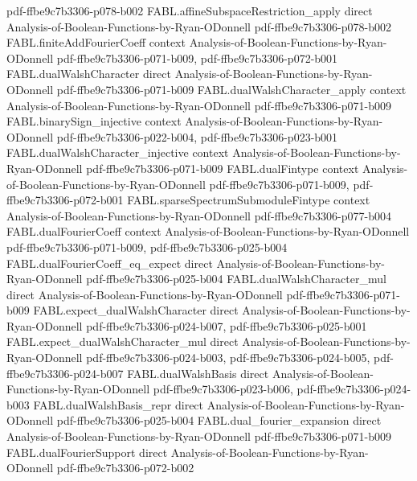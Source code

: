 \begin{theorem}
  {pdf-ffbe9c7b3306-p078-b002}
\proofstep
  {FABL.affineSubspaceRestriction_apply}
  {direct}
  {Analysis-of-Boolean-Functions-by-Ryan-ODonnell}
  {pdf-ffbe9c7b3306-p078-b002}
\proofstep
  {FABL.finiteAddFourierCoeff}
  {context}
  {Analysis-of-Boolean-Functions-by-Ryan-ODonnell}
  {pdf-ffbe9c7b3306-p071-b009,
    pdf-ffbe9c7b3306-p072-b001}
\proofstep
  {FABL.dualWalshCharacter}
  {direct}
  {Analysis-of-Boolean-Functions-by-Ryan-ODonnell}
  {pdf-ffbe9c7b3306-p071-b009}
\proofstep
  {FABL.dualWalshCharacter_apply}
  {context}
  {Analysis-of-Boolean-Functions-by-Ryan-ODonnell}
  {pdf-ffbe9c7b3306-p071-b009}
\proofstep
  {FABL.binarySign_injective}
  {context}
  {Analysis-of-Boolean-Functions-by-Ryan-ODonnell}
  {pdf-ffbe9c7b3306-p022-b004,
    pdf-ffbe9c7b3306-p023-b001}
\proofstep
  {FABL.dualWalshCharacter_injective}
  {context}
  {Analysis-of-Boolean-Functions-by-Ryan-ODonnell}
  {pdf-ffbe9c7b3306-p071-b009}
\proofstep
  {FABL.dualFintype}
  {context}
  {Analysis-of-Boolean-Functions-by-Ryan-ODonnell}
  {pdf-ffbe9c7b3306-p071-b009,
    pdf-ffbe9c7b3306-p072-b001}
\proofstep
  {FABL.sparseSpectrumSubmoduleFintype}
  {context}
  {Analysis-of-Boolean-Functions-by-Ryan-ODonnell}
  {pdf-ffbe9c7b3306-p077-b004}
\proofstep
  {FABL.dualFourierCoeff}
  {context}
  {Analysis-of-Boolean-Functions-by-Ryan-ODonnell}
  {pdf-ffbe9c7b3306-p071-b009,
    pdf-ffbe9c7b3306-p025-b004}
\proofstep
  {FABL.dualFourierCoeff_eq_expect}
  {direct}
  {Analysis-of-Boolean-Functions-by-Ryan-ODonnell}
  {pdf-ffbe9c7b3306-p025-b004}
\proofstep
  {FABL.dualWalshCharacter_mul}
  {direct}
  {Analysis-of-Boolean-Functions-by-Ryan-ODonnell}
  {pdf-ffbe9c7b3306-p071-b009}
\proofstep
  {FABL.expect_dualWalshCharacter}
  {direct}
  {Analysis-of-Boolean-Functions-by-Ryan-ODonnell}
  {pdf-ffbe9c7b3306-p024-b007,
    pdf-ffbe9c7b3306-p025-b001}
\proofstep
  {FABL.expect_dualWalshCharacter_mul}
  {direct}
  {Analysis-of-Boolean-Functions-by-Ryan-ODonnell}
  {pdf-ffbe9c7b3306-p024-b003,
    pdf-ffbe9c7b3306-p024-b005,
    pdf-ffbe9c7b3306-p024-b007}
\proofstep
  {FABL.dualWalshBasis}
  {direct}
  {Analysis-of-Boolean-Functions-by-Ryan-ODonnell}
  {pdf-ffbe9c7b3306-p023-b006,
    pdf-ffbe9c7b3306-p024-b003}
\proofstep
  {FABL.dualWalshBasis_repr}
  {direct}
  {Analysis-of-Boolean-Functions-by-Ryan-ODonnell}
  {pdf-ffbe9c7b3306-p025-b004}
\proofstep
  {FABL.dual_fourier_expansion}
  {direct}
  {Analysis-of-Boolean-Functions-by-Ryan-ODonnell}
  {pdf-ffbe9c7b3306-p071-b009}
\proofstep
  {FABL.dualFourierSupport}
  {direct}
  {Analysis-of-Boolean-Functions-by-Ryan-ODonnell}
  {pdf-ffbe9c7b3306-p072-b002}

\end{theorem}
